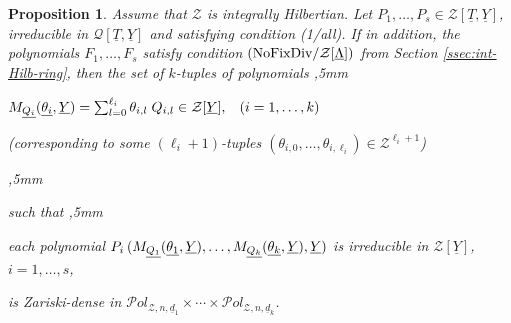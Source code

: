 \documentclass[11pt,a4paper,reqno]{amsart}
\newtheorem{prop}[thm]{Proposition}
\theoremstyle{definition}
\begin{document}
\begin{prop} \label{prop:generalSchH}
Assume that ${\mathcal Z}$ is integrally Hilbertian.
Let $P_1,\ldots,P_s\in {\mathcal Z}[\underline T, \underline Y]$, irreducible in ${\mathcal Q}[\underline T, \underline Y]$ and satisfying condition {\rm (1/{\rm all})}.
If in addition, the polynomials $F_1,\ldots,F_s$ satisfy condition $\hbox{\rm (NoFixDiv}/{\mathcal Z}[\underline \Lambda])$ \emph{from Section \ref{ssec:int-Hilb-ring}}, then the set of $k$-tuples of polynomials
,5mm

\centerline{$M_{\underline {Q_i}}({\underline{\theta_i}}, \underline Y) = \sum_{l=0}^{\ell_i} \theta_{i,l} \hskip 1mm Q_{i,l}\in {\mathcal Z}[\underline Y], \hskip 3mm (i=1,\ldots,k)$}
\vskip 1mm


\centerline{(corresponding to some $(\ell_i+1)$-tuples $(\theta_{i,0}, \ldots, \theta_{i,\ell_i}) \in {\mathcal Z}^{\ell_i+1}$)}

,5mm

\noindent
such that
,5mm

\noindent
{each polynomial $P_i\hskip 2pt (M_{\underline {Q_1}}({\underline{\theta_1}}, \underline Y), \ldots, M_{\underline {Q_k}}({\underline{\theta_k}}, \underline Y),\underline Y)$ is irreducible in ${\mathcal Z}[\underline Y]$, $i=1,\ldots,s$,}
\vskip 2mm

\noindent
is Zariski-dense in ${\mathcal P}ol_{{\mathcal Z},n,\underline{d}_1} \times \cdots \times {\mathcal P}ol_{{\mathcal Z},n,\underline{d}_k}$.










\end{prop}
\end{document}
